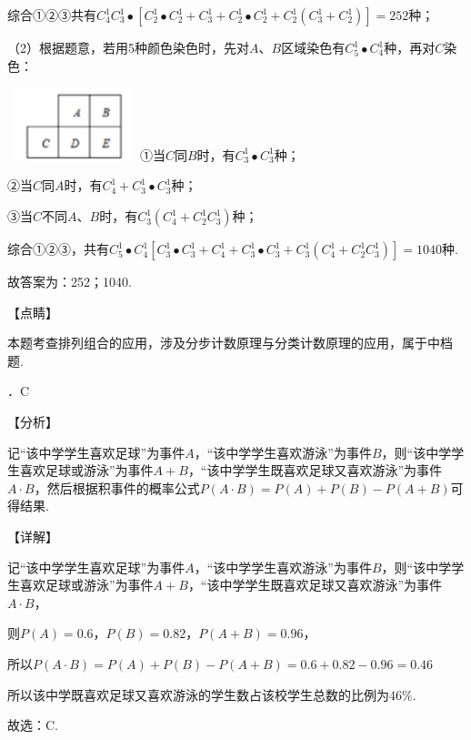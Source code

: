\documentclass[a4paper,11pt,UTF8,twoside]{ctexart} %
\begin{document}
\noindent 综合①②③共有$C_{4}^{1} C_{3}^{1} \bullet [C_{2}^{1} \bullet C_{2}^{1} +C_{3}^{1} +C_{2}^{1} \bullet C_{2}^{1} +C_{2}^{1} (C_{3}^{1} +C_{2}^{1} )]=252$种；

\noindent （2）根据题意，若用5种颜色染色时，先对$A$、$B$区域染色有$C_{5}^{1} \bullet C_{4}^{1} $种，再对$C$染色：

\noindent \includegraphics*[width=1.52in, height=0.83in, keepaspectratio=false, trim=0.00in 0.09in 0.00in 0.07in]{image289}①当$C$同$B$时，有$C_{3}^{1} \bullet C_{3}^{1} $种；

\noindent ②当$C$同$A$时，有$C_{4}^{1} +C_{3}^{1} \bullet C_{3}^{1} $种；

\noindent ③当$C$不同$A$、$B$时，有$C_{3}^{1} (C_{4}^{1} +C_{2}^{1} C_{3}^{1} )$种；

\noindent 综合①②③，共有$C_{5}^{1} \bullet C_{4}^{1} [C_{3}^{1} \bullet C_{3}^{1} +C_{4}^{1} +C_{3}^{1} \bullet C_{3}^{1} +C_{3}^{1} (C_{4}^{1} +C_{2}^{1} C_{3}^{1} )]=1040$种.

\noindent 故答案为：252；1040.

\noindent 【点睛】

\noindent 本题考查排列组合的应用，涉及分步计数原理与分类计数原理的应用，属于中档题.

．C

\noindent 【分析】

\noindent 记``该中学学生喜欢足球''为事件$A$，``该中学学生喜欢游泳''为事件$B$，则``该中学学生喜欢足球或游泳''为事件$A+B$，``该中学学生既喜欢足球又喜欢游泳''为事件$A\cdot B$，然后根据积事件的概率公式$P(A\cdot B)=$$P(A)+P(B)-P(A+B)$可得结果.

\noindent 【详解】

\noindent 记``该中学学生喜欢足球''为事件$A$，``该中学学生喜欢游泳''为事件$B$，则``该中学学生喜欢足球或游泳''为事件$A+B$，``该中学学生既喜欢足球又喜欢游泳''为事件$A\cdot B$，

\noindent 则$P(A)=0.6$，$P(B)=0.82$，$P\left(A+B\right)=0.96$，

\noindent 所以$P(A\cdot B)=$$P(A)+P(B)-P(A+B)$$=0.6+0.82-0.96=0.46$

\noindent 所以该中学既喜欢足球又喜欢游泳的学生数占该校学生总数的比例为$46\% $.

\noindent 故选：C.
\end{document}
